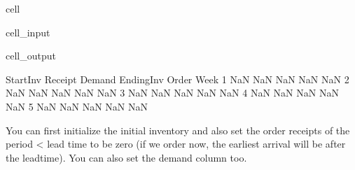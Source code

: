\documentclass[letterpaper,10pt,english]{jupyterBook}
\begin{document}
\begin{sphinxuseclass}{cell}\begin{sphinxVerbatimInput}

\begin{sphinxuseclass}{cell_input}
\begin{sphinxVerbatim}[commandchars=\\\{\}]
  \PYG{p}{[}    \PYG{p}{]}
  
      
  
\end{sphinxVerbatim}

\end{sphinxuseclass}\end{sphinxVerbatimInput}
\begin{sphinxVerbatimOutput}

\begin{sphinxuseclass}{cell_output}
\begin{sphinxVerbatim}[commandchars=\\\{\}]
     Start\PYGZus{}Inv Receipt Demand Ending\PYGZus{}Inv Order
Week                                          
1          NaN     NaN    NaN        NaN   NaN
2          NaN     NaN    NaN        NaN   NaN
3          NaN     NaN    NaN        NaN   NaN
4          NaN     NaN    NaN        NaN   NaN
5          NaN     NaN    NaN        NaN   NaN
\end{sphinxVerbatim}

\end{sphinxuseclass}\end{sphinxVerbatimOutput}

\end{sphinxuseclass}
\sphinxAtStartPar
You can first initialize the initial inventory and also set the order receipts of the period < lead time to be zero (if we order now, the earliest arrival will be after the leadtime). You can also set the demand column too.
\end{document}
